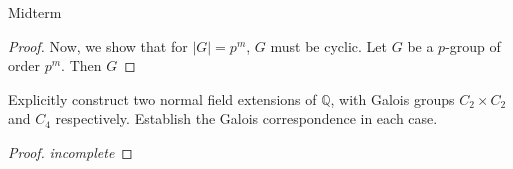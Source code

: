 \documentclass[12pt]{article}
\theoremstyle{definition}
\newenvironment{problem}[2][Problem]{\begin{trivlist}
\item[\hskip \labelsep {\bfseries #1}\hskip \labelsep {\bfseries #2.}]}{\end{trivlist}}
\begin{document}
\begin{section}{Midterm}
\begin{problem}{9}
\begin{proof}
		\par Now, we show that for $\left \lvert { G } \right \lvert = p^m$, $G$ must be cyclic. Let $G$ be a $p$-group of order $p^m$. Then $G$ 
	\end{proof}
\end{problem}
\begin{problem}{10}
	Explicitly construct two normal field extensions of $\mathbb Q$, with Galois groups $C_2 \times C_2$ and $C_4$ respectively. Establish the Galois correspondence in each case.
	\begin{proof}
		\textit{incomplete}
	\end{proof}
\end{problem}
\end{section}
\end{document}
